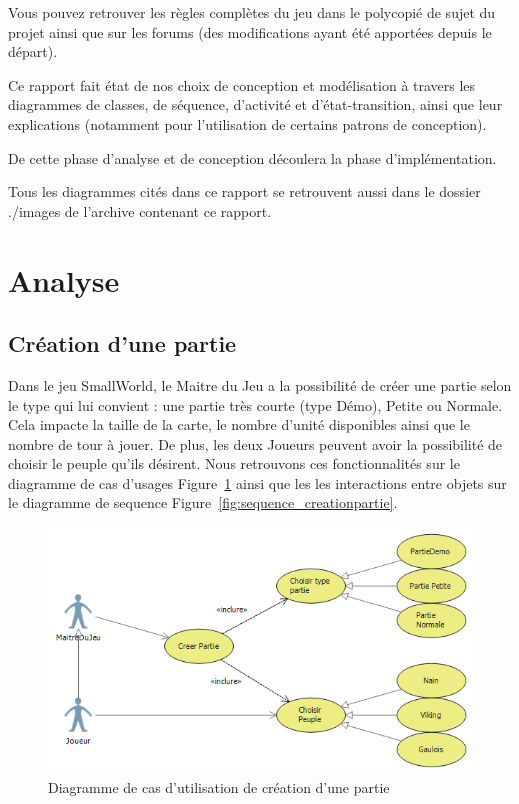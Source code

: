 \documentclass[a4paper]{article}%
\begin{document}
\medskip

Vous pouvez retrouver les règles complètes du jeu dans le polycopié de sujet du projet ainsi que sur les forums (des modifications ayant été apportées depuis le départ).

\medskip

Ce rapport fait état de nos choix de conception et modélisation à travers les diagrammes de classes, de séquence, d'activité et d'état-transition, ainsi que leur explications (notamment pour l'utilisation de certains patrons de conception).

De cette phase d'analyse et de conception découlera la phase d'implémentation.

\medskip

Tous les diagrammes cités dans ce rapport se retrouvent aussi dans le dossier ./images de l'archive contenant ce rapport.

\newpage

\section{Analyse}


\subsection{Création d'une partie}

Dans le jeu SmallWorld, le Maitre du Jeu a la possibilité de créer une partie selon le type qui lui convient : une partie très courte (type Démo), Petite ou Normale. Cela impacte la taille de la carte, le nombre d'unité disponibles ainsi que le nombre de tour à jouer. De plus, les deux Joueurs peuvent avoir la possibilité de choisir le peuple qu'ils désirent.
Nous retrouvons ces fonctionnalités sur le diagramme de cas d'usages Figure~\ref{fig:use_case_creationpartie} ainsi que les les interactions entre objets sur le diagramme de sequence Figure~\ref{fig:sequence_creationpartie}.


\begin{figure}[H]
    \centering
    \includegraphics[width=\textwidth]{./images/use_case/DiagUseCaseCreationPartie.png}
                \caption{Diagramme de cas d'utilisation de création d'une partie}
                \label{fig:use_case_creationpartie}
\end{figure}
\end{document}
